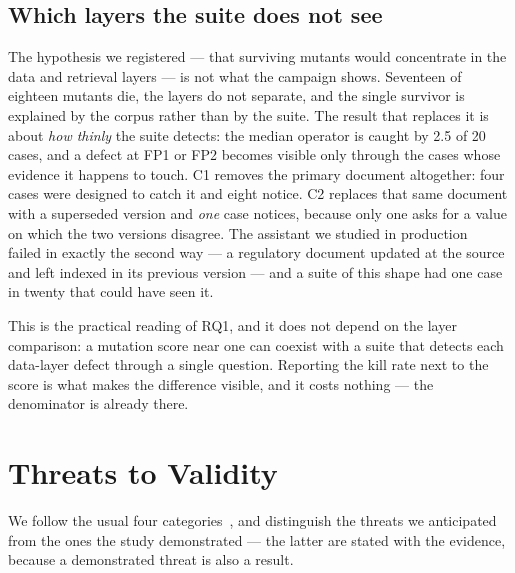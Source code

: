 \documentclass[a4paper,fleqn]{cas-dc}
\begin{document}
\subsection{Which layers the suite does not see}

The hypothesis we registered --- that surviving mutants would concentrate in
the data and retrieval layers --- is not what the campaign shows. Seventeen of
eighteen mutants die, the layers do not separate, and the single survivor is
explained by the corpus rather than by the suite. The result that replaces it
is about \emph{how thinly} the suite detects: the median operator is caught by
2.5 of 20 cases, and a defect at FP1 or FP2 becomes visible only through the
cases whose evidence it happens to touch. C1 removes the primary document
altogether: four cases were designed to catch it and eight notice. C2 replaces
that same document with a superseded version and \emph{one} case notices,
because only one asks for a value on which the two versions disagree. The
assistant we studied in production~\cite{oliveira2026sast} failed in exactly
the second way --- a regulatory document updated at the source and left indexed
in its previous version --- and a suite of this shape had one case in twenty
that could have seen it.

This is the practical reading of RQ1, and it does not depend on the layer
comparison: a mutation score near one can coexist with a suite that detects
each data-layer defect through a single question. Reporting the kill rate next
to the score is what makes the difference visible, and it costs nothing --- the
denominator is already there.

\section{Threats to Validity}
\label{sec:threats}

We follow the usual four categories~\cite{runeson2009guidelines}, and
distinguish the threats we anticipated from the ones the study demonstrated
--- the latter are stated with the evidence, because a demonstrated threat is
also a result.
\end{document}
